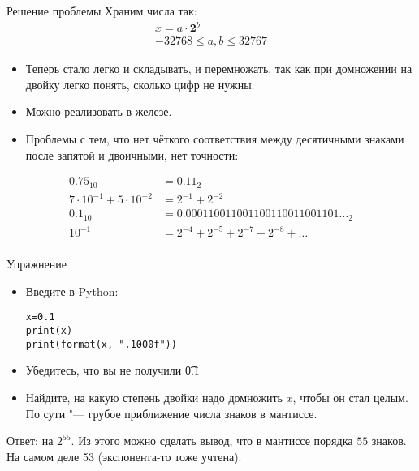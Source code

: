 \begin{frame}{Решение проблемы}
	Храним числа так:
	\begin{gather*}
		x = a \cdot \textbf{2}^b \\
		-32768 \le a, b \le 32767
	\end{gather*}
	\begin{itemize}
		\item Теперь стало легко и складывать, и перемножать, так как при домножении на двойку легко понять, сколько цифр не нужны.
		\item Можно реализовать в железе.
		\item
			Проблемы с тем, что нет чёткого соответствия между десятичными знаками после запятой и двоичными,
			нет точности:
	\end{itemize}
	\begin{align*}
		0.75_{10} &= {0.11}_{2} \\
		7 \cdot 10^{-1} + 5 \cdot 10^{-2} &= 2^{-1} + 2^{-2} \\
		0.1_{10} &= {0.000110011001100110011001101\dots}_{2} \\
		10^{-1} &= 2^{-4} + 2^{-5} + 2^{-7} + 2^{-8} + \dots \\
	\end{align*}
\end{frame}

\begin{frame}[fragile]{Упражнение}
	\begin{itemize}
		\item
			Введите в Python:
\begin{verbatim}
x=0.1
print(x)
print(format(x, ".1000f"))
\end{verbatim}
		\item
			Убедитесь, что вы не получили \t{0.1}
		\item
			Найдите, на какую степень двойки надо домножить $x$, чтобы он стал целым.
			По сути "--- грубое приближение числа знаков в мантиссе.
	\end{itemize}
	\pause
	Ответ: на $2^{55}$.
	Из этого можно сделать вывод, что в мантиссе порядка $55$ знаков.
	На самом деле 53 (экспонента-то тоже учтена).
\end{frame}

